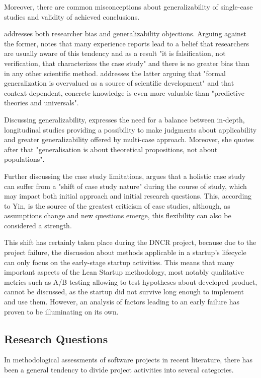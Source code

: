 \documentclass{article}
\begin{document}
Moreover, there are common misconceptions about generalizability of single-case studies and validity of achieved conclusions.

\cite{flyvbjerg2006five} addresses both researcher bias and generalizability objections. Arguing against the former, \citeauthor{flyvbjerg2006five} notes that many experience reports lead to a belief that researchers are usually aware of this tendency and as a result "it is falsification, not verification, that characterizes the case study" and there is no greater bias than in any other scientific method. \citeauthor{flyvbjerg2006five} addresses the latter arguing that "formal generalization is overvalued as a source of scientific development" and that context-dependent, concrete knowledge is even more valuable than "predictive theories and universals". \citep[235-237]{flyvbjerg2006five}

Discussing generalizability, \cite{meyer2001case} expresses the need for a balance between in-depth, longitudinal studies providing a possibility to make judgments about applicability and greater generalizability offered by multi-case approach. Moreover, she quotes after \citet[225]{hartle1994case} that "generalisation is about theoretical propositions, not about populations".

Further discussing the case study limitations, \citet[52]{yin2013case} argues that a holistic case study can suffer from a "shift of case study nature" during the course of study, which may impact both initial approach and initial research questions. This, according to Yin, is the source of the greatest criticism of case studies, although, as assumptions change and new questions emerge, this flexibility can also be considered a strength.

This shift has certainly taken place during the DNCR project, because due to the project failure, the discussion about methods applicable in a startup's lifecycle can only focus on the early-stage startup activities. This means that many important aspects of the Lean Startup methodology, most notably qualitative metrics such as A/B testing allowing to test hypotheses about developed product, cannot be discussed, as the startup did not survive long enough to implement and use them. However, an analysis of factors leading to an early failure has proven to be illuminating on its own.

\subsection{Research Questions}
In methodological assessments of software projects in recent literature, there has been a general tendency to divide project activities into several categories.
\end{document}
